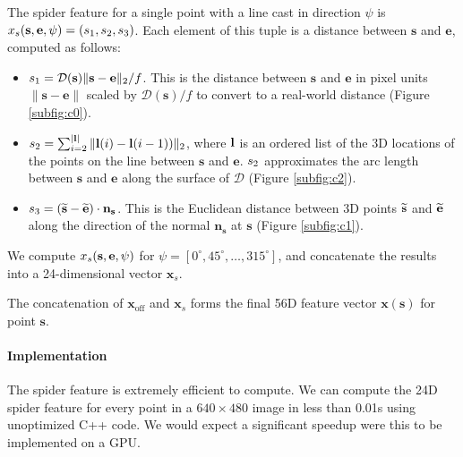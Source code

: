 \documentclass[10pt,twocolumn,letterpaper]{article}
\newcommand{\degree}{^{\circ}}
\newcommand{\feat}{\mathbf{x}}
\newcommand{\rgbdimage}{\mathcal{D}}
\newcommand{\pixelidx}{\mathbf{s}}
\newcommand{\edgeimidx}{\mathbf{e}}
\newcommand{\normal}{\mathbf{n}}
\newcommand{\todo}[1]{\textcolor{red}{TODO: #1}}
\begin{document}
The spider feature for a single point with a line cast in direction $\psi$ is $\scalfeat_s(\pixelidx, \edgeimidx, \psi) = (\spiderfeat_1, \spiderfeat_2, \spiderfeat_3)$.
Each element of this tuple is a distance between $\pixelidx$ and $\edgeimidx$, computed as follows:
\begin{itemize}

\item $\spiderfeat_1 = \rgbdimage(\pixelidx) \|\pixelidx - \edgeimidx\|_2 / f$. This is the distance between $\pixelidx$ and $\edgeimidx$ in pixel units $\|\pixelidx - \edgeimidx\|$ scaled by $\rgbdimage(\pixelidx) / f$ to convert to a real-world distance (Figure \ref{subfig:c0}).

\item $s_2 = \sum_{i=2}^{|\mathbf{l}|} \| \mathbf{l}(i) - \mathbf{l}(i-1)) \|_2 $, where $\mathbf{l}$ is an ordered list of the 3D locations of the points on the line between $\pixelidx$ and $\edgeimidx$.
$s_2$ approximates the arc length between $\pixelidx$ and $\edgeimidx$ along the surface of $\rgbdimage$  (Figure \ref{subfig:c2}).

\item $\spiderfeat_3 = (\pointthreed - \edgethreed) \cdot \normal_\pixelidx$. 
This is the Euclidean distance between 3D points $\pointthreed$ and $\edgethreed$ along the direction of the normal $\normal_\pixelidx$ at $\pixelidx$  (Figure \ref{subfig:c1}).

\end{itemize}

We compute $\scalfeat_s(\pixelidx, \edgeimidx, \psi)$ for  $\psi = [0\degree, 45\degree, \ldots, 315\degree]$, and concatenate the results into a  24-dimensional vector $\feat_s$.

The concatenation of $\feat_\text{off}$ and $\feat_s$ forms the final 56D feature vector $\feat(\pixelidx)$ for point $\pixelidx$.

\paragraph{Implementation}
The spider feature is extremely efficient to compute.
We can compute the 24D spider feature for every point in a $640\times480$ image in less than 0.01s using unoptimized C++ code.
We would expect a significant speedup were this to be implemented on a GPU.

\end{document}

